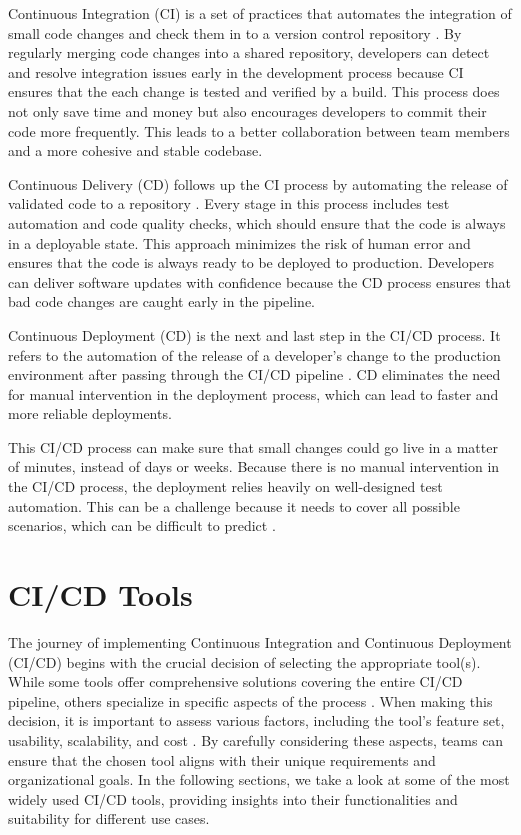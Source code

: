 Continuous Integration (CI) is a set of practices that automates the integration of small code changes and check them in to a version control repository \autocite{Sacolick2024}.
By regularly merging code changes into a shared repository, developers can detect and resolve integration issues early in the development process because CI ensures that the each change is tested and verified by a build.
This process does not only save time and money but also encourages developers to commit their code more frequently.
This leads to a better collaboration between team members and a more cohesive and stable codebase.

Continuous Delivery (CD) follows up the CI process by automating the release of validated code to a repository \autocite{Hat2023}.
Every stage in this process includes test automation and code quality checks, which should ensure that the code is always in a deployable state.
This approach minimizes the risk of human error and ensures that the code is always ready to be deployed to production. 
Developers can deliver software updates with confidence because the CD process ensures that bad code changes are caught early in the pipeline.

Continuous Deployment (CD) is the next and last step in the CI/CD process.
It refers to the automation of the release of a developer's change to the production environment after passing through the CI/CD pipeline \autocite{Hat2023}.
CD eliminates the need for manual intervention in the deployment process, which can lead to faster and more reliable deployments.

This CI/CD process can make sure that small changes could go live in a matter of minutes, instead of days or weeks. 
Because there is no manual intervention in the CI/CD process, the deployment relies heavily on well-designed test automation.
This can be a challenge because it needs to cover all possible scenarios, which can be difficult to predict \autocite{Hat2023}.



\section{CI/CD Tools}
The journey of implementing Continuous Integration and Continuous Deployment (CI/CD) begins with the crucial decision of selecting the appropriate tool(s). 
While some tools offer comprehensive solutions covering the entire CI/CD pipeline, others specialize in specific aspects of the process \autocite{Hat2023}. 
When making this decision, it is important to assess various factors, including the tool's feature set, usability, scalability, and cost \autocite{Synopsys}. 
By carefully considering these aspects, teams can ensure that the chosen tool aligns with their unique requirements and organizational goals.
In the following sections, we take a look at some of the most widely used CI/CD tools, providing insights into their functionalities and suitability for different use cases.


